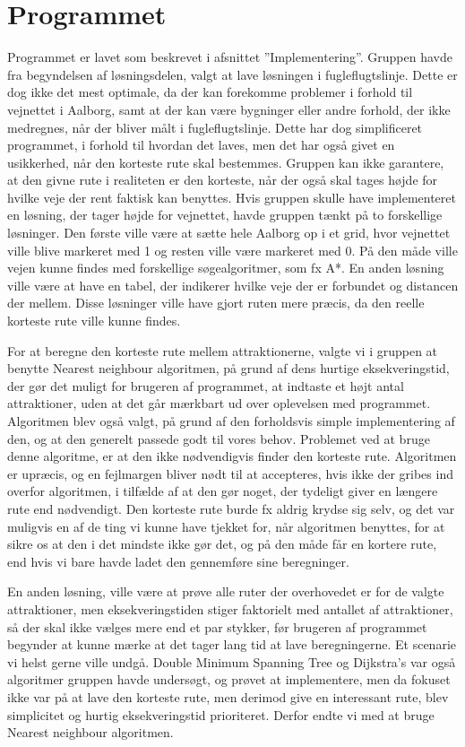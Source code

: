 \section{Programmet}
Programmet er lavet som beskrevet i afsnittet ”Implementering”. Gruppen havde fra begyndelsen af løsningsdelen, valgt at lave løsningen i fugleflugtslinje. Dette er dog ikke det mest optimale, da der kan forekomme problemer i forhold til vejnettet i Aalborg, samt at der kan være bygninger eller andre forhold, der ikke medregnes, når der bliver målt i fugleflugtslinje. Dette har dog simplificeret programmet, i forhold til hvordan det laves, men det har også givet en usikkerhed, når den korteste rute skal bestemmes. Gruppen kan ikke garantere, at den givne rute i realiteten er den korteste, når der også skal tages højde for hvilke veje der rent faktisk kan benyttes. \newline
Hvis gruppen skulle have implementeret en løsning, der tager højde for vejnettet, havde gruppen tænkt på to forskellige løsninger. Den første ville være at sætte hele Aalborg op i et grid, hvor vejnettet ville blive markeret med 1 og resten ville være markeret med 0. På den måde ville vejen kunne findes med forskellige søgealgoritmer, som fx A*. En anden løsning ville være at have en tabel, der indikerer hvilke veje der er forbundet og distancen der mellem. Disse løsninger ville have gjort ruten mere præcis, da den reelle korteste rute ville kunne findes. 

For at beregne den korteste rute mellem attraktionerne, valgte vi i gruppen at benytte Nearest neighbour algoritmen, på grund af dens hurtige eksekveringstid, der gør det muligt for brugeren af programmet, at indtaste et højt antal attraktioner, uden at det går mærkbart ud over oplevelsen med programmet. Algoritmen blev også valgt, på grund af den forholdsvis simple implementering af den, og at den generelt passede godt til vores behov. Problemet ved at bruge denne algoritme, er at den ikke nødvendigvis finder den korteste rute. Algoritmen er upræcis, og en fejlmargen bliver nødt til at accepteres, hvis ikke der gribes ind overfor algoritmen, i tilfælde af at den gør noget, der tydeligt giver en længere rute end nødvendigt. Den korteste rute burde fx aldrig krydse sig selv, og det var muligvis en af de ting vi kunne have tjekket for, når algoritmen benyttes, for at sikre os at den i det mindste ikke gør det, og på den måde får en kortere rute, end hvis vi bare havde ladet den gennemføre sine beregninger. 

En anden løsning, ville være at prøve alle ruter der overhovedet er for de valgte attraktioner, men eksekveringstiden stiger faktorielt med antallet af attraktioner, så der skal ikke vælges mere end et par stykker, før brugeren af programmet begynder at kunne mærke at det tager lang tid at lave beregningerne. Et scenarie vi helst gerne ville undgå.
Double Minimum Spanning Tree og Dijkstra’s var også algoritmer gruppen havde undersøgt, og prøvet at implementere, men da fokuset ikke var på at lave den korteste rute, men derimod give en interessant rute, blev simplicitet og hurtig eksekveringstid prioriteret. Derfor endte vi med at bruge Nearest neighbour algoritmen.

